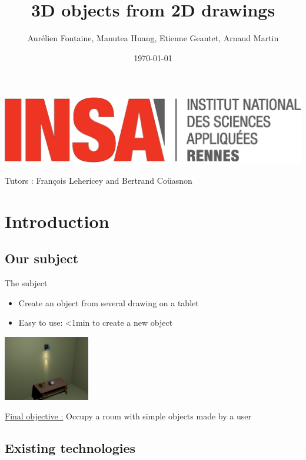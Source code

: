 \documentclass[a4paper,10pt]{beamer}
\title{3D objects from 2D drawings}
\author[Groupe 3INFO]{Aurélien Fontaine, Manutea Huang, Etienne Geantet, Arnaud Martin}
\institute[INSA de Rennes]{Institut National des Sciences Appliquées de Rennes}
\date{\today}
\begin{document}
	
	\begin{frame}
		\begin{titlepage}
			\centerline{\includegraphics[scale=0.1]{images/logos/logoINSA.jpg}}
			\centerline{Tutors : François Lehericey and Bertrand Coüasnon}	
		\end{titlepage}
	\end{frame}
	

	
	\section{Introduction}

		
		\subsection{Our subject}
		
		\begin{frame}{The subject}
			\begin{itemize}
				\item Create an object from several drawing on a tablet
				\item Easy to use: <1min to create a new object
			\end{itemize}
			\centerline{\includegraphics[height=80pt]{images/room.jpg}}              
			\underline{Final objective :} Occupy a room with simple objects made by a user
		\end{frame}
		
			
	\begin{frame}
		\tableofcontents
	\end{frame}
			
				\subsection{Existing technologies}
		
\end{document}
